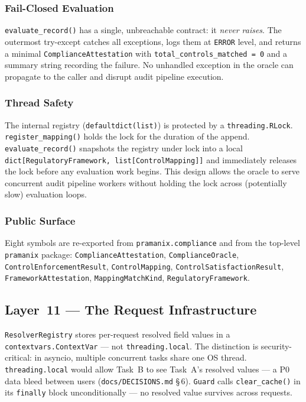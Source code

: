 \documentclass[12pt,a4paper,oneside]{report}
\newcommand{\fname}[1]{\texttt{#1}}          %
\newcommand{\code}[1]{\texttt{#1}}           %
\newcommand{\cfrsec}[1]{\S\,#1}             %
\begin{document}
\subsubsection{Fail-Closed Evaluation}

\code{evaluate\_record()} has a single, unbreachable contract:
it \emph{never raises}.  The outermost try-except catches all exceptions,
logs them at \code{ERROR} level, and returns a minimal
\code{ComplianceAttestation} with \code{total\_controls\_matched = 0} and a
summary string recording the failure.  No unhandled exception in the oracle
can propagate to the caller and disrupt audit pipeline execution.

\subsubsection{Thread Safety}

The internal registry (\code{defaultdict(list)}) is protected by a
\code{threading.RLock}.  \code{register\_mapping()} holds the lock for the
duration of the append.  \code{evaluate\_record()} snapshots the registry
under lock into a local \code{dict[RegulatoryFramework, list[ControlMapping]]}
and immediately releases the lock before any evaluation work begins.  This
design allows the oracle to serve concurrent audit pipeline workers without
holding the lock across (potentially slow) evaluation loops.

\subsubsection{Public Surface}

Eight symbols are re-exported from \code{pramanix.compliance} and from the
top-level \code{pramanix} package: \code{ComplianceAttestation},
\code{ComplianceOracle}, \code{ControlEnforcementResult},
\code{ControlMapping}, \code{ControlSatisfactionResult},
\code{FrameworkAttestation}, \code{MappingMatchKind},
\code{RegulatoryFramework}.

\subsection{Layer~11 --- The Request Infrastructure}

\code{ResolverRegistry} stores per-request resolved field values in a
\code{contextvars.ContextVar} --- not \code{threading.local}. The distinction
is security-critical: in asyncio, multiple concurrent tasks share one OS
thread. \code{threading.local} would allow Task~B to see Task~A's resolved
values --- a P0 data bleed between users (\fname{docs/DECISIONS.md}
\cfrsec{6}). \code{Guard} calls \code{clear\_cache()} in its \code{finally}
block unconditionally --- no resolved value survives across requests.
\end{document}
